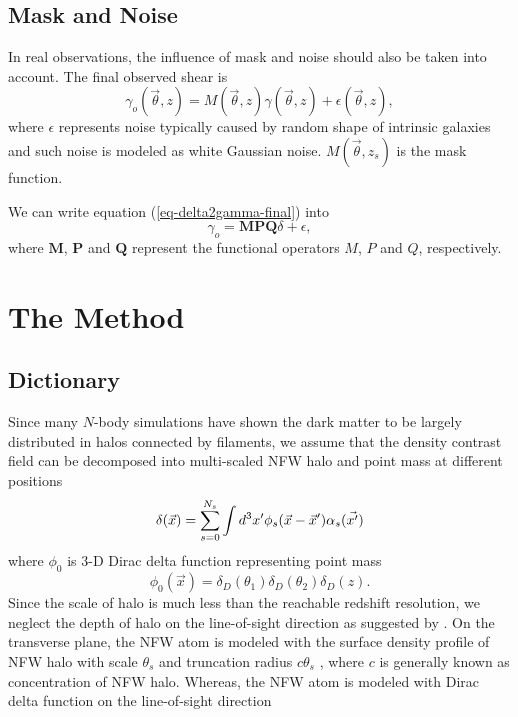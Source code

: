 \documentclass[twocolumn]{aastex62}
\begin{document}
\subsection{Mask and Noise}
In real observations, the influence of mask and noise should also be taken into account. The final observed shear is
\begin{equation}\label{eq-delta2gamma-final}
\gamma_o(\vec{\theta},z)=M(\vec{\theta},z) \gamma(\vec{\theta},z) + \epsilon(\vec{\theta},z),
\end{equation}
where $\epsilon$ represents noise typically caused by random shape of intrinsic galaxies and such noise is modeled as white Gaussian noise. $M(\vec{\theta},z_s)$ is the mask function.

We can write equation (\ref{eq-delta2gamma-final}) into
\begin{equation}\label{eq-delta2gamma-operator-final}
\gamma_o =\mathbf{M}  \mathbf{P} \mathbf{Q} \delta + \epsilon,
\end{equation}
where $\mathbf{M}$,  $\mathbf{P}$ and $\mathbf{Q}$ represent the functional operators $M$, $P$ and $Q$, respectively.

\section{The Method}
\label{sec:kappaMap}

\subsection{Dictionary}
Since many $N$-body simulations have shown the dark matter to be largely distributed in halos connected by filaments,
we assume that the density contrast field can be decomposed into multi-scaled NFW halo \citep{halo-NFW1997ApJ} and point mass at different positions
\begin{equation}
\delta(\vec{x}) = \sum_{s=0}^{N_s} \int d^3 x' \phi_s(\vec{x}-\vec{x}') \alpha_s(\vec{x'})\\
\end{equation}
where $\phi_0$ is $3$-D Dirac delta function representing point mass
\begin{equation}
\phi_0(\vec{x})= \delta_D(\theta_1) \delta_D(\theta_2) \delta_D(z).
\end{equation}
Since the scale of halo is much less than the reachable redshift resolution, we neglect the depth of halo on the line-of-sight direction as suggested by \citep{massMap-Glimpse3D2014}.
On the transverse plane, the NFW atom is modeled with the surface density profile of NFW halo with scale $\theta_s$ and truncation radius $c \theta_s$ \citep{haloModel-TJ2003-3pt}, where $c$ is generally known as concentration of NFW halo.  Whereas, the NFW atom is modeled with Dirac delta function on the line-of-sight direction
\end{document}
